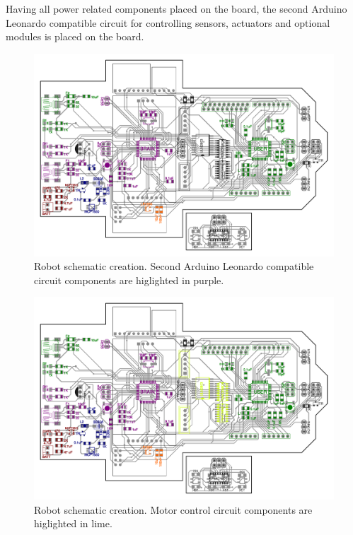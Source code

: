 \documentclass[11pt,a4paper]{article}
\begin{document}
Having all power related components placed on the board, the second Arduino Leonardo compatible circuit for controlling sensors, actuators and optional modules is placed on the board. 

\begin{figure}[H]
  \centering
  \includegraphics[width=\textwidth]{robot_schematic_brain.pdf}
  \caption{Robot schematic creation. Second Arduino Leonardo compatible circuit components are higlighted in purple.}
\end{figure}

\begin{figure}[H]
  \centering
  \includegraphics[width=\textwidth]{robot_schematic_motor.pdf}
  \caption{Robot schematic creation. Motor control circuit components are higlighted in lime.}
\end{figure}
\end{document}
